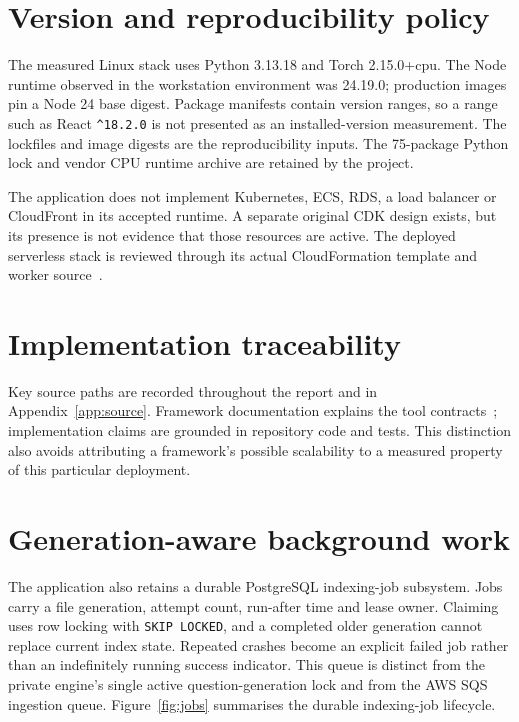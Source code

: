 \section{Version and reproducibility policy}
The measured Linux stack uses Python 3.13.18 and Torch 2.15.0+cpu. The Node runtime observed in the workstation environment was 24.19.0; production images pin a Node 24 base digest. Package manifests contain version ranges, so a range such as React \texttt{\^{}18.2.0} is not presented as an installed-version measurement. The lockfiles and image digests are the reproducibility inputs. The 75-package Python lock and vendor CPU runtime archive are retained by the project.

The application does not implement Kubernetes, ECS, RDS, a load balancer or CloudFront in its accepted runtime. A separate original CDK design exists, but its presence is not evidence that those resources are active. The deployed serverless stack is reviewed through its actual CloudFormation template and worker source~\cite{cloudformation}.
\section{Implementation traceability}
Key source paths are recorded throughout the report and in Appendix~\ref{app:source}. Framework documentation explains the tool contracts~\cite{react,express,fastapi,prisma}; implementation claims are grounded in repository code and tests. This distinction also avoids attributing a framework's possible scalability to a measured property of this particular deployment.
\section{Generation-aware background work}
The application also retains a durable PostgreSQL indexing-job subsystem. Jobs carry a file generation, attempt count, run-after time and lease owner. Claiming uses row locking with \texttt{SKIP LOCKED}, and a completed older generation cannot replace current index state. Repeated crashes become an explicit failed job rather than an indefinitely running success indicator. This queue is distinct from the private engine's single active question-generation lock and from the AWS SQS ingestion queue.
Figure~\ref{fig:jobs} summarises the durable indexing-job lifecycle.
\FloatBarrier
